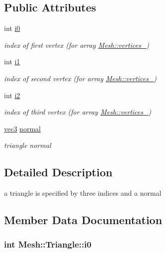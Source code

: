 \subsection*{Public Attributes}
\begin{DoxyCompactItemize}
\item 
int \hyperlink{structMesh_1_1Triangle_a6a61f7ea00034397eed1adcf0fae1790}{i0}
\begin{DoxyCompactList}\small\item\em index of first vertex (for array \hyperlink{classMesh_a986edf1ab1d37e517ff8adc928519528}{Mesh\+::vertices\+\_\+}) \end{DoxyCompactList}\item 
int \hyperlink{structMesh_1_1Triangle_afc583a0169089f8a73367a31cec7bc39}{i1}
\begin{DoxyCompactList}\small\item\em index of second vertex (for array \hyperlink{classMesh_a986edf1ab1d37e517ff8adc928519528}{Mesh\+::vertices\+\_\+}) \end{DoxyCompactList}\item 
int \hyperlink{structMesh_1_1Triangle_ae123132ba821ea91e4a9fb12349bd4ea}{i2}
\begin{DoxyCompactList}\small\item\em index of third vertex (for array \hyperlink{classMesh_a986edf1ab1d37e517ff8adc928519528}{Mesh\+::vertices\+\_\+}) \end{DoxyCompactList}\item 
\hyperlink{classvec3}{vec3} \hyperlink{structMesh_1_1Triangle_a697c3d7e2f4a316e7b486e048efff56d}{normal}
\begin{DoxyCompactList}\small\item\em triangle normal \end{DoxyCompactList}\end{DoxyCompactItemize}


\subsection{Detailed Description}
a triangle is specified by three indices and a normal 

\subsection{Member Data Documentation}
\subsubsection[{\texorpdfstring{i0}{i0}}]{\setlength{\rightskip}{0pt plus 5cm}int Mesh\+::\+Triangle\+::i0}\hypertarget{structMesh_1_1Triangle_a6a61f7ea00034397eed1adcf0fae1790}{}\label{structMesh_1_1Triangle_a6a61f7ea00034397eed1adcf0fae1790}


